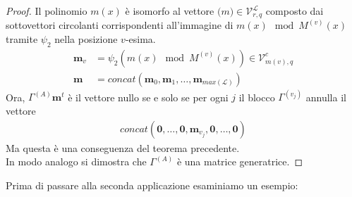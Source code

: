 \begin{proof}
   Il polinomio $m(x)$ è isomorfo al vettore $\mathbf(m) \in \mathcal{V}_{r, q}^{\mathscr{L}}$ composto dai sottovettori circolanti corrispondenti all'immagine di $m(x) \mod M^{(v)}(x)$ tramite $\psi_{2}$ nella posizione $v$-esima.
   \begin{align*}
      \mathbf{m}_{v} &= \psi_{2}(m(x) \mod M^{(v)}(x)) \in  \mathcal{V}_{m(v), q}^{c} \\
      \mathbf{m} &= concat(\mathbf{m}_{0},\mathbf{m}_{1},\dots, \mathbf{m}_{max(\mathscr{L})})
   \end{align*}
   Ora, $\Gamma^{(A)}\mathbf{m}^{t}$ è il vettore nullo se e solo se per ogni $j$ il blocco $\Gamma^{(v_{j})}$ annulla il vettore
   \begin{align*}
      concat(\mathbf{0}, \dots, \mathbf{0}, \mathbf{m}_{v_{j}},\mathbf{0},\dots, \mathbf{0})
   \end{align*}
   Ma questa è una conseguenza del teorema precedente.\\
   In modo analogo si dimostra che $\Gamma^{(A)}$ è una matrice generatrice.
\end{proof}
Prima di passare alla seconda applicazione esaminiamo un esempio:
